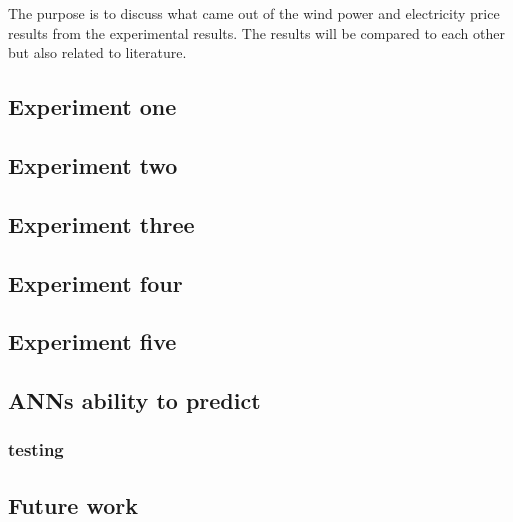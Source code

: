 The purpose is to discuss what came out of the wind power and electricity price results from the experimental results. The results will be compared to each other but also related to literature.

\subsection{Experiment one}
\label{sec:inputParameterDiscussion}


\subsection{Experiment two}


\subsection{Experiment three}


\subsection{Experiment four}


\subsection{Experiment five}
\label{sec:stepAheadForecastingDiscussion}


\subsection{ANNs ability to predict}
\subsubsection{testing}



\subsection{Future work}



